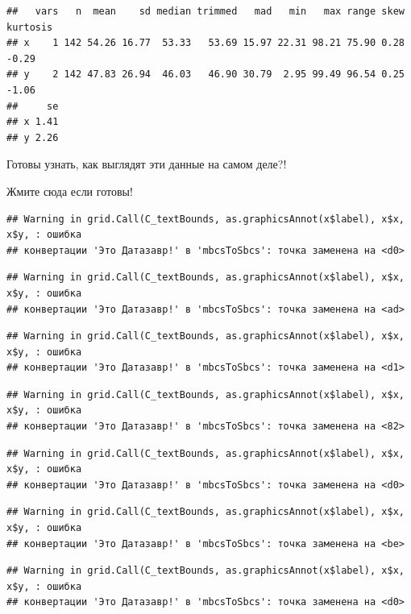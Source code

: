 \documentclass[]{book}
\begin{document}
\begin{verbatim}
##   vars   n  mean    sd median trimmed   mad   min   max range skew kurtosis
## x    1 142 54.26 16.77  53.33   53.69 15.97 22.31 98.21 75.90 0.28    -0.29
## y    2 142 47.83 26.94  46.03   46.90 30.79  2.95 99.49 96.54 0.25    -1.06
##     se
## x 1.41
## y 2.26
\end{verbatim}

Готовы узнать, как выглядят эти данные на самом деле?!

 Жмите сюда если готовы!

\begin{verbatim}
## Warning in grid.Call(C_textBounds, as.graphicsAnnot(x$label), x$x, x$y, : ошибка
## конвертации 'Это Датазавр!' в 'mbcsToSbcs': точка заменена на <d0>
\end{verbatim}

\begin{verbatim}
## Warning in grid.Call(C_textBounds, as.graphicsAnnot(x$label), x$x, x$y, : ошибка
## конвертации 'Это Датазавр!' в 'mbcsToSbcs': точка заменена на <ad>
\end{verbatim}

\begin{verbatim}
## Warning in grid.Call(C_textBounds, as.graphicsAnnot(x$label), x$x, x$y, : ошибка
## конвертации 'Это Датазавр!' в 'mbcsToSbcs': точка заменена на <d1>
\end{verbatim}

\begin{verbatim}
## Warning in grid.Call(C_textBounds, as.graphicsAnnot(x$label), x$x, x$y, : ошибка
## конвертации 'Это Датазавр!' в 'mbcsToSbcs': точка заменена на <82>
\end{verbatim}

\begin{verbatim}
## Warning in grid.Call(C_textBounds, as.graphicsAnnot(x$label), x$x, x$y, : ошибка
## конвертации 'Это Датазавр!' в 'mbcsToSbcs': точка заменена на <d0>
\end{verbatim}

\begin{verbatim}
## Warning in grid.Call(C_textBounds, as.graphicsAnnot(x$label), x$x, x$y, : ошибка
## конвертации 'Это Датазавр!' в 'mbcsToSbcs': точка заменена на <be>
\end{verbatim}

\begin{verbatim}
## Warning in grid.Call(C_textBounds, as.graphicsAnnot(x$label), x$x, x$y, : ошибка
## конвертации 'Это Датазавр!' в 'mbcsToSbcs': точка заменена на <d0>
\end{verbatim}
\end{document}
